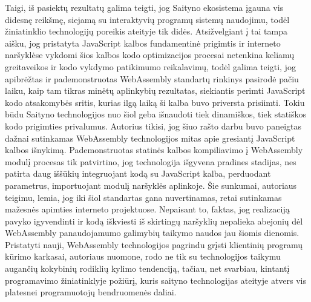 \documentclass{VUMIFPSkursinis}
\begin{document}
 
Taigi, iš pasiektų rezultatų galima teigti, jog Saityno ekosistema įgauna vis didesnę reikšmę, siejamą su interaktyvių programų sistemų naudojimu, todėl žiniatinklio technologijų poreikis ateityje tik didės. Atsižvelgiant į tai tampa aišku, jog pristatyta JavaScript kalbos fundamentinė prigimtis ir interneto naršyklėse vykdomi šios kalbos kodo optimizacijos procesai netenkina keliamų greitaveikos ir kodo vykdymo patikimumo reikalavimų, todėl galima teigti, jog apibrėžtas ir pademonstruotas WebAssembly standartų rinkinys pasirodė pačiu laiku, kaip tam tikras minėtų aplinkybių rezultatas, siekiantis perimti JavaScript kodo atsakomybės sritis, kurias ilgą laiką ši kalba buvo priversta prisiimti. Tokiu būdu Saityno technologijos nuo šiol geba išnaudoti tiek dinamiškos, tiek statiškos kodo prigimties privalumus. Autorius tikisi, jog šiuo rašto darbu buvo paneigtas dažnai sutinkamas WebAssembly technologijos mitas apie gresiantį JavaScript kalbos išnykimą. Pademonstruotas statinės kalbos kompiliavimo į WebAssembly modulį procesas tik patvirtino, jog technologija išgyvena pradines stadijas, nes patirta daug iššūkių integruojant kodą su JavaScript kalba, perduodant parametrus, importuojant modulį naršyklės aplinkoje. Šie sunkumai, autoriaus teigimu, lemia, jog iki šiol standartas gana nuvertinamas, retai sutinkamas mažesnės apimties interneto projektuose. Nepaisant to, faktas, jog realizaciją pavyko igyvendinti ir kodą iškviesti iš skirtingų naršyklių nepalieka abejonių dėl WebAssembly panaudojamumo galimybių taikymo naudos jau šiomis dienomis. Pristatyti nauji, WebAssembly technologijos pagrindu grįsti klientinių programų kūrimo karkasai, autoriaus nuomone, rodo ne tik su technologijos taikymu augančių kokybinių rodiklių kylimo tendenciją, tačiau, net svarbiau, kintantį programavimo žiniatinklyje požiūrį, kuris saityno technologijas ateityje atvers vis platesnei programuotojų bendruomenės daliai.
\printbibliography[heading=bibintoc, title=Šaltiniai]  %
\end{document}
